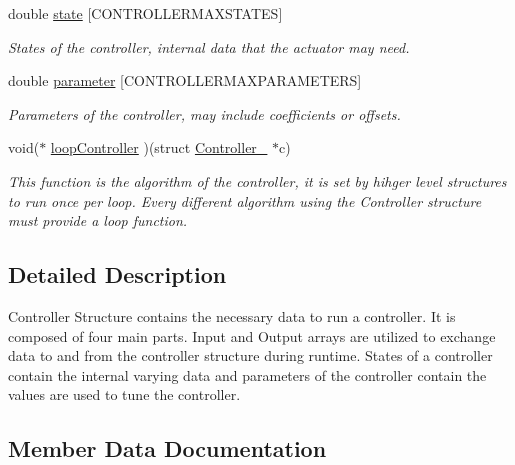 \begin{DoxyCompactItemize}
\mbox{\label{struct_controller___a36673cd95422d92e51d0d90fc0e8485c}} 
double \hyperlink{struct_controller___a36673cd95422d92e51d0d90fc0e8485c}{state} \mbox{[}C\+O\+N\+T\+R\+O\+L\+L\+E\+R\+M\+A\+X\+S\+T\+A\+T\+ES\mbox{]}
\begin{DoxyCompactList}\small\item\em States of the controller, internal data that the actuator may need. \end{DoxyCompactList}\item 
\mbox{\label{struct_controller___abecfc45970cfcd7e9385e2fbf851ab16}} 
double \hyperlink{struct_controller___abecfc45970cfcd7e9385e2fbf851ab16}{parameter} \mbox{[}C\+O\+N\+T\+R\+O\+L\+L\+E\+R\+M\+A\+X\+P\+A\+R\+A\+M\+E\+T\+E\+RS\mbox{]}
\begin{DoxyCompactList}\small\item\em Parameters of the controller, may include coefficients or offsets. \end{DoxyCompactList}\item 
void($\ast$ \hyperlink{struct_controller___ac5ade2089c5a8f6fd1fcbad7edcb6273}{loop\+Controller} )(struct \hyperlink{struct_controller__}{Controller\+\_\+} $\ast$c)
\begin{DoxyCompactList}\small\item\em This function is the algorithm of the controller, it is set by hihger level structures to run once per loop. Every different algorithm using the Controller structure must provide a loop function. \end{DoxyCompactList}\end{DoxyCompactItemize}


\subsection{Detailed Description}
Controller Structure contains the necessary data to run a controller. It is composed of four main parts. Input and Output arrays are utilized to exchange data to and from the controller structure during runtime. States of a controller contain the internal varying data and parameters of the controller contain the values are used to tune the controller. 

\subsection{Member Data Documentation}
\mbox{\label{struct_controller___ac5ade2089c5a8f6fd1fcbad7edcb6273}} 
